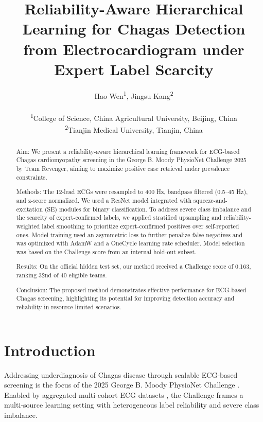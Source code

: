 \documentclass[twocolumn]{cinc}
\title{Reliability-Aware Hierarchical Learning for Chagas Detection from Electrocardiogram under Expert Label Scarcity}
\author{Hao Wen\textsuperscript{1},
Jingsu Kang\textsuperscript{2} \\ \ \\
\textsuperscript{1}College of Science, China Agricultural University, Beijing, China\\
\textsuperscript{2}Tianjin Medical University, Tianjin, China
}
\begin{document}
\maketitle



\begin{abstract}


Aim: We present a reliability-aware hierarchical learning framework for ECG-based Chagas cardiomyopathy screening in the George B. Moody PhysioNet Challenge 2025 by Team Revenger, aiming to maximize positive case retrieval under prevalence constraints.

Methods: The 12-lead ECGs were resampled to 400 Hz, bandpass filtered (0.5–45 Hz), and z-score normalized. We used a ResNet model integrated with squeeze-and-excitation (SE) modules for binary classification. To address severe class imbalance and the scarcity of expert-confirmed labels, we applied stratified upsampling and reliability-weighted label smoothing to prioritize expert-confirmed positives over self-reported ones. Model training used an asymmetric loss to further penalize false negatives and was optimized with AdamW and a OneCycle learning rate scheduler. Model selection was based on the Challenge score from an internal hold-out subset.

Results: On the official hidden test set, our method received a Challenge score of 0.163, ranking 32nd of 40 eligible teams.

Conclusion: The proposed method demonstrates effective performance for ECG-based Chagas screening, highlighting its potential for improving detection accuracy and reliability in resource-limited scenarios.

\end{abstract}



\section{Introduction}
\label{sec:intro}


Addressing underdiagnosis of Chagas disease through scalable ECG-based screening is the focus of the 2025 George B. Moody PhysioNet Challenge \cite{goldberger2000physionet, 2025ChallengeCinC, 2025ChallengePreprint}. Enabled by aggregated multi-cohort ECG datasets \cite{ribeiro2020automatic, Cardoso_2016_Sami-Trop, wagner2020ptb_xl, Nunes_2021_Incidence, Filho_2020_Prognostic}, the Challenge frames a multi-source learning setting with heterogeneous label reliability and severe class imbalance.
\end{document}
